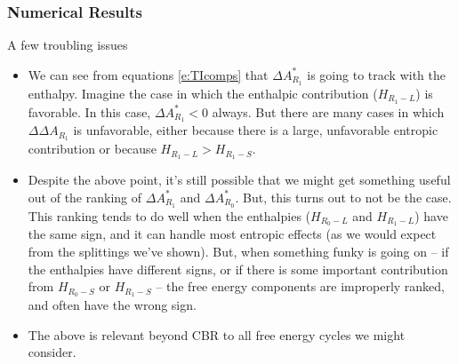 \documentclass[%
 preprint,
 amsmath,amssymb,
 aps,
]{revtex4-1}
\begin{document}
 \subsubsection{Numerical Results}
 A few troubling issues
 \begin{itemize}
 \item We can see from equations \ref{e:TIcomps} that $\Delta A^*_{R_1}$ is going to track with the enthalpy.  Imagine the case in which the enthalpic contribution ($H_{R_1-L}$) is favorable.  In this case,  $\Delta A^*_{R_1} < 0$ always.  But there are many cases in which $\Delta \Delta A_{R_1}$ is unfavorable, either because there is a large, unfavorable entropic contribution or because $H_{R_1-L} > H_{R_1-S}$.
 \item Despite the above point, it's still possible that we might get something useful out of the ranking of   $\Delta A^*_{R_1}$ and 
 $\Delta A^*_{R_0}$.  But, this turns out to not be the case.  This ranking tends to do well when the enthalpies ($H_{R_0-L}$ and 
 $H_{R_1-L}$) have the same sign, and it can handle most entropic effects (as we would expect from the splittings we've shown).  But, when something funky is going on -- if the enthalpies have different signs, or if there is some important contribution from $H_{R_0-S}$ or 
 $H_{R_1-S}$ -- the free energy components are improperly ranked, and often have the wrong sign. 
\item The above is relevant beyond CBR to all free energy cycles we might consider. 
 \end{itemize}
 
 
 
\end{document}
